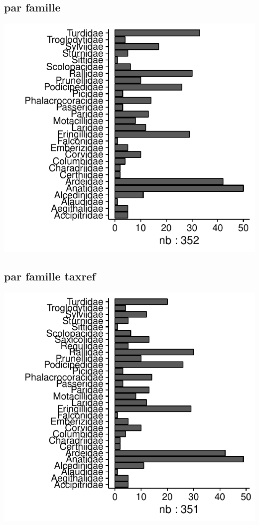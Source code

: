 \subsection*{par famille}
\includegraphics[width=\malargeurgraphique]{images/faune_stat_champ_FAMILY_NAME.pdf}
\subsection*{par famille taxref}
\includegraphics[width=\malargeurgraphique]{images/faune_stat_champ_FAMILLE.pdf}
